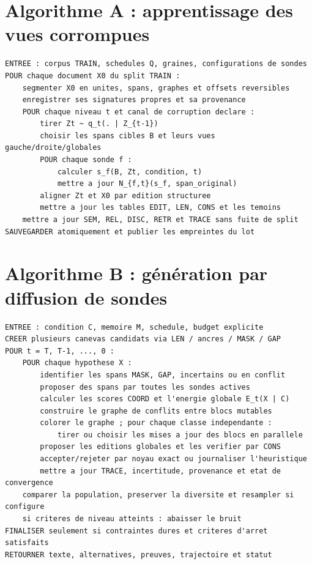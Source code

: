 \documentclass[11pt,a4paper,oneside]{report}
\begin{document}
\section{Algorithme A : apprentissage des vues corrompues}
\begin{lstlisting}[basicstyle=\ttfamily\small,breaklines=true,frame=single]
ENTREE : corpus TRAIN, schedules Q, graines, configurations de sondes
POUR chaque document X0 du split TRAIN :
    segmenter X0 en unites, spans, graphes et offsets reversibles
    enregistrer ses signatures propres et sa provenance
    POUR chaque niveau t et canal de corruption declare :
        tirer Zt ~ q_t(. | Z_{t-1})
        choisir les spans cibles B et leurs vues gauche/droite/globales
        POUR chaque sonde f :
            calculer s_f(B, Zt, condition, t)
            mettre a jour N_{f,t}(s_f, span_original)
        aligner Zt et X0 par edition structuree
        mettre a jour les tables EDIT, LEN, CONS et les temoins
    mettre a jour SEM, REL, DISC, RETR et TRACE sans fuite de split
SAUVEGARDER atomiquement et publier les empreintes du lot
\end{lstlisting}

\section{Algorithme B : génération par diffusion de sondes}
\begin{lstlisting}[basicstyle=\ttfamily\small,breaklines=true,frame=single]
ENTREE : condition C, memoire M, schedule, budget explicite
CREER plusieurs canevas candidats via LEN / ancres / MASK / GAP
POUR t = T, T-1, ..., 0 :
    POUR chaque hypothese X :
        identifier les spans MASK, GAP, incertains ou en conflit
        proposer des spans par toutes les sondes actives
        calculer les scores COORD et l'energie globale E_t(X | C)
        construire le graphe de conflits entre blocs mutables
        colorer le graphe ; pour chaque classe independante :
            tirer ou choisir les mises a jour des blocs en parallele
        proposer les editions globales et les verifier par CONS
        accepter/rejeter par noyau exact ou journaliser l'heuristique
        mettre a jour TRACE, incertitude, provenance et etat de convergence
    comparer la population, preserver la diversite et resampler si configure
    si criteres de niveau atteints : abaisser le bruit
FINALISER seulement si contraintes dures et criteres d'arret satisfaits
RETOURNER texte, alternatives, preuves, trajectoire et statut
\end{lstlisting}
\end{document}
